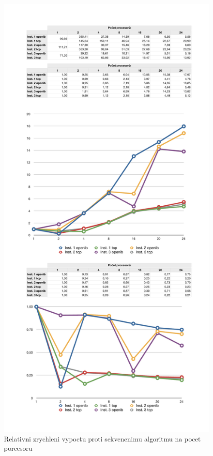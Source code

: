 \documentclass[a4paper]{article}
\begin{document}
\begin{figure}[ht]
\centerline{\includegraphics[width=\textwidth]{table-rel-per-cpu.pdf}}
\caption{Relativni zrychleni vypoctu proti sekvencnimu algoritmu na pocet porcesoru}
\label{table-rel-per-cpu}
\end{figure}
\end{document}
